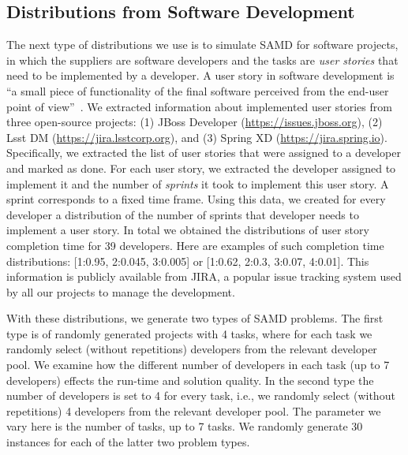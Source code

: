 \documentclass[letterpaper]{article} %
\newcommand{\samd}{\ac{SAMD}\xspace}
\newcommand\Roni[1]{\nb{\textbf{Roni:}}{blue}{#1}}
\begin{document}
\subsection{Distributions from Software Development}
The next type of distributions we use is to simulate \samd for software projects, in which the suppliers are software developers and the tasks are \emph{user stories} that need to be implemented by a developer. A user story in software development is ``a small piece of functionality of the final software perceived from the end-user point of view''~\cite{rees2002feasible,kassab2015changing}.
We extracted information about implemented user stories from three open-source projects: (1) JBoss Developer (\url{https://issues.jboss.org}), (2) Lsst DM (\url{https://jira.lsstcorp.org}), and (3) Spring XD (\url{https://jira.spring.io}). 
Specifically, we extracted the list of user stories that were assigned to a developer and marked as done. For each user story, we extracted the developer assigned to implement it and the number of \emph{sprints} it took to implement this user story. A sprint corresponds to a fixed time frame. Using this data, we created for every developer a distribution of the number of sprints that developer needs to implement a user story. 
In total we obtained the distributions of user story completion time for 39 developers. Here are examples of such completion time distributions: [1:0.95,	2:0.045, 3:0.005] or [1:0.62,	2:0.3,	3:0.07,	4:0.01].
This information is publicly available from JIRA, a popular issue tracking system used by all our projects to manage the development. %


With these distributions, we generate two types of \samd problems. 
The first type is of randomly generated projects with 4 tasks, where for each task we randomly select (without repetitions) developers from the relevant developer pool. 
We examine how the different number of developers in each task (up to 7 developers) effects the run-time and solution quality. 
In the second type the number of developers is set to 4 for every task, i.e., we randomly select (without repetitions) 4 developers from the relevant developer pool. The parameter we vary here is the number of tasks, up to 7 tasks. We randomly generate 30 instances for each of the latter two problem types.
\end{document}
